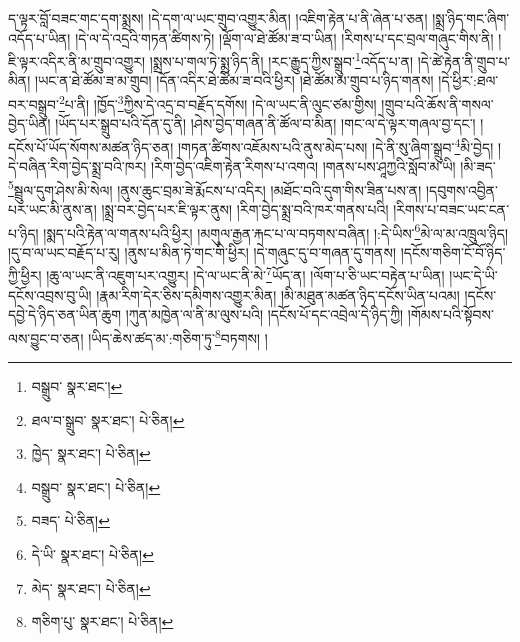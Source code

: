 ད་ལྟར་བློ་བཟང་གང་དག་སྨྲས། །དེ་དག་ལ་ཡང་གྲུབ་འགྱུར་མིན། །འཇིག་རྟེན་པ་ནི་ཞེན་པ་ཅན། །སྨྲ་ཉིད་གང་ཞིག་འདོད་པ་ཡིན། །དེ་ལ་དེ་འདྲའི་གཏན་ཚིགས་ཏེ། །ལྡོག་ལ་ཐེ་ཚོམ་ཟ་བ་ཡིན། །རིགས་པ་དང་བྲལ་གཞུང་གིས་ནི། །ཇི་ལྟར་འདིར་ནི་མ་གྲུབ་འགྱུར། །སྨྲས་པ་གལ་ཏེ་སྨྲ་ཉིད་ནི། །རང་རྒྱུད་ཀྱིས་སྒྲུབ་\footnote{བསྒྲུབ་  སྣར་ཐང་། }འདོད་པ་ན། །དེ་ཚེ་རྟེན་ནི་གྲུབ་པ་མིན། །ཡང་ན་ཐེ་ཚོམ་ཟ་མ་གྲུབ། །དོན་འདིར་ཐེ་ཚོམ་ཟ་བའི་ཕྱིར། །ཐེ་ཚོམ་མ་གྲུབ་པ་ཉིད་གནས། །དེ་ཕྱིར་:ཐལ་བར་བསྒྲུབ་\footnote{ཐལ་བ་སྒྲུབ་  སྣར་ཐང་།  པེ་ཅིན། }པ་ནི། །ཁྱོད་\footnote{ཁྱེད་  སྣར་ཐང་།  པེ་ཅིན། }ཀྱིས་དེ་འདྲ་བ་བརྗོད་དགོས། །དེ་ལ་ཡང་ནི་ལུང་ཙམ་གྱིས། །གྲུབ་པའི་ཆོས་ནི་གསལ་བྱེད་ཡིན། །ཡོད་པར་སྒྲུབ་པའི་དོན་དུ་ནི། །ཤེས་བྱེད་གཞན་ནི་ཚོལ་བ་མིན། །གང་ལ་དེ་ལྟར་གཞལ་བྱ་དང་། །དངོས་པོ་ཡོད་སོགས་མཚན་ཉིད་ཅན། །གཏན་ཚིགས་འཇོམས་པའི་ནུས་མེད་པས། །དེ་ནི་སུ་ཞིག་སྒྲུབ་\footnote{བསྒྲུབ་  སྣར་ཐང་།  པེ་ཅིན། }མི་བྱེད། །དེ་བཞིན་རིག་བྱེད་སྨྲ་བའི་ཁར། །རིག་བྱེད་འཇིག་རྟེན་རིགས་པ་འགའ། །གནས་པས་ཤཱཀྱའི་སློབ་མ་ཡི། །མི་ཟད་\footnote{བཟད་  པེ་ཅིན། }སྦྲུལ་དུག་ཤེས་མི་སེལ། །ནུས་ཆུང་བྲམ་ཟེ་རྨོངས་པ་འདིར། །མཐོང་བའི་དུག་གིས་ཟིན་པས་ན། །དབུགས་འབྱིན་པར་ཡང་མི་ནུས་ན། །སྨྲ་བར་བྱེད་པར་ཇི་ལྟར་ནུས། །རིག་བྱེད་སྨྲ་བའི་ཁར་གནས་པའི། །རིགས་པ་བཟང་ཡང་ངན་པ་ཉིད། །སྨད་པའི་རྟེན་ལ་གནས་པའི་ཕྱིར། །མགུལ་རྒྱན་རྐང་པ་ལ་བཏགས་བཞིན། །:དེ་ཡིས་\footnote{དེ་ཡི་  སྣར་ཐང་།  པེ་ཅིན། }མེ་ལ་མ་འཁྲུལ་ཉིད། །དུ་བ་ལ་ཡང་བརྗོད་པ་རུ། །ནུས་པ་མིན་ཏེ་གང་གི་ཕྱིར། །དེ་གཞུང་དུ་བ་གཞན་དུ་གནས། །དངོས་གཅིག་ངོ་བོ་ཉིད་ཀྱི་ཕྱིར། །ཆུ་ལ་ཡང་ནི་འཇུག་པར་འགྱུར། །དེ་ལ་ཡང་ནི་མེ་\footnote{མེད་  སྣར་ཐང་།  པེ་ཅིན། }ཡོད་ན། །ལོག་པ་ཅི་ཡང་བརྟེན་པ་ཡིན། །ཡང་དེ་ཡི་དངོས་འབྲས་བུ་ཡི། །རྣམ་རིག་དེར་ཅིས་དམིགས་འགྱུར་མིན། །མི་མཐུན་མཚན་ཉིད་དངོས་ཡིན་པའམ། །དངོས་དབྱེ་དེ་ཉིད་ཅན་ཡིན་ཆུག །ཀུན་མཁྱེན་ལ་ནི་མ་ལུས་པའི། །དངོས་པོ་དང་འབྲེལ་དེ་ཉིད་ཀྱི། །གོམས་པའི་སྟོབས་ལས་བྱུང་བ་ཅན། །ཡིད་ཆེས་ཚད་མ་:གཅིག་ཏུ་\footnote{གཅིག་པུ་  སྣར་ཐང་།  པེ་ཅིན། }བཏགས། །
